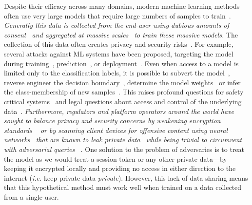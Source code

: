\documentclass[conference]{IEEEtran}
\newcommand{\cm}[1]{\textit{{\color{blue}#1}}}
\begin{document}
Despite their efficacy across many domains, modern machine learning methods often use very large models that require large numbers of samples to train~\cite{desislavov2021compute}.  
\cm{Generally this data is collected from the end-user using dubious amounts of consent~\cite{nouwens2020dark} and aggregated at massive scales~\cite{desislavov2021compute} to train these massive models.} 
The collection of this data often creates privacy and security risks~\cite{chakraborty_adversarial_2018,meyers}. 
For example, several attacks against ML systems have been proposed, targeting the model during training~\cite{biggio_poisoning_2013}, prediction~\cite{biggio_evasion_2013,deepfool,carlini_towards_2017}, or deployment~\cite{distributed_attacks,santos2021universal}.
Even when access to a model is limited only to the classification labels, it is possible to subvert the model~\cite{hopskipjump}, reverse engineer the decision boundary~\cite{deepfool}, determine the model weights~\cite{jagielski2020high} or infer the class-membership of new samples~\cite{bentley2020quantifying}. 
This raises profound questions for safety critical systems~\cite{meyers} and legal questions about access and control of the underlying data~\cite{mitrou2018data,marks2023ai}. 
\cm{
Furthermore, regulators and platform operators around the world have sought to balance privacy and security concerns by weakening encryption standards ~\cite{amnesty_encryption} or by scanning client devices for offensive content using neural networks~\cite{chat_control} that are known to leak private data~\cite{xiao2021improving,fredrikson_model_2015} while being trivial to circumvent with adversarial queries ~\cite{carlini_towards_2017,dohmatob_generalized_2019,hopskipjump,biggio_evasion_2013,meyers,chakraborty_adversarial_2018}.
}
One solution to the problem of adversaries is to treat the model as we would treat a session token or any other private data---by keeping it encrypted locally and providing no access in either direction to the internet (\textit{i.e.} keep private data \textit{private}).
However, this lack of data sharing means that this hypothetical method must work well when trained on a data collected from a single user.
\end{document}
